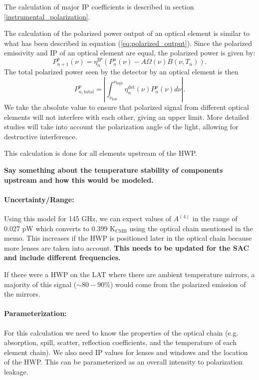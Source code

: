 The calculation of major IP coefficients is described in section \ref{instrumental_polarization}.


The calculation of the polarized power output of an optical element is similar to what has been described in equation (\ref{eq:polarized_output}).
Since the polarized emissivity and IP of an optical element are equal, the polarized power is given by:
\begin{equation}
P^p_{n+1}(\nu) = \eta^\text{IP}_n \left(P_n^u (\nu) - A\Omega(\nu) B(\nu, T_n) \right).
\end{equation}
The total polarized power seen by the detector by an optical element is then
\begin{equation}
P^p_{n, \text{total}} = \left|\int_{\nu_\text{low}}^{\nu_\text{high}} \eta_n^\text{det}(\nu) P^p_n(\nu) d\nu\right|.
\end{equation}
We take the absolute value to ensure that polarized signal from different optical elements will not interfere
with each other, giving an upper limit.
More detailed studies will take into account the polarization angle of the light, allowing for destructive interference.

This calculation is done for all elements upstream of the HWP.

\textbf{Say something about the temperature stability of components upstream and how this would be modeled.}

\paragraph{Uncertainty/Range:}
Using this model for 145 GHz, we can expect values of $A^{(4)}$ in the range of 0.027 pW which converts to 0.399 K$_\text{CMB}$ using the optical chain mentioned in the memo. This increases if the HWP is positioned later in the optical chain because more lenses are taken into account.
\textbf{This needs to be updated for the SAC and include different frequencies.}

If there were a HWP on the LAT where there are ambient temperature mirrors, a majority of this signal ($\sim 80-90\%$) would come from the polarized emission of the mirrors.

\paragraph{Parameterization:}
For this calculation we need to know the properties of the optical chain (e.g. absorption, spill, scatter, reflection coefficients, and 
the temperature of each element chain). We also need IP values for lenses and windows and the location of the HWP. This can be parameterized as an overall intensity to polarization leakage.



